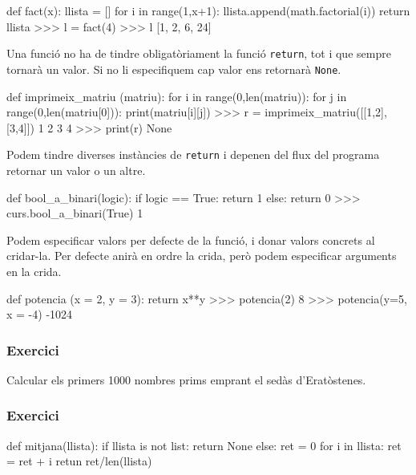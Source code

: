 \begin{tip}[caption=Retornar llista de valors]
def fact(x):
    llista = []
    for i in range(1,x+1):
        llista.append(math.factorial(i))
    return llista
>>> l = fact(4)
>>> l
[1, 2, 6, 24]
\end{tip}



Una funció no ha de tindre obligatòriament la funció {\tt return}, tot i que sempre tornarà un valor. Si no li especifiquem cap valor ens retornarà {\tt None}.

\begin{blockcode}
def imprimeix_matriu (matriu):
    for i in range(0,len(matriu)):
        for j in range(0,len(matriu[0])):
            print(matriu[i][j])
>>> r = imprimeix_matriu([[1,2],[3,4]])
1
2
3
4
>>> print(r)
None
\end{blockcode}

Podem tindre diverses instàncies de {\tt return} i depenen del flux del programa retornar un valor o un altre.

\begin{tip}[caption=Diversos return]
def bool_a_binari(logic):
    if logic == True:
        return 1
    else:
        return 0
>>> curs.bool_a_binari(True)
1
\end{tip}


Podem especificar valors per defecte de la funció, i donar valors concrets al cridar-la. Per defecte anirà en ordre la crida, però podem especificar arguments en la crida.

\begin{tip}[caption=Valors per defecte i ordre dels paràmetres]
def potencia (x = 2, y = 3):
    return x**y
>>> potencia(2)
8
>>> potencia(y=5, x = -4)
-1024
\end{tip}


\subsubsection*{Exercici } 

Calcular els primers 1000 nombres prims emprant el sedàs d'Eratòstenes.


\subsubsection*{Exercici } 

\begin{blockcode}
def mitjana(llista):
    if llista is not list:
        return None
    else:
        ret = 0
        for i in llista:
            ret = ret + i
        retun ret/len(llista)
\end{blockcode}



